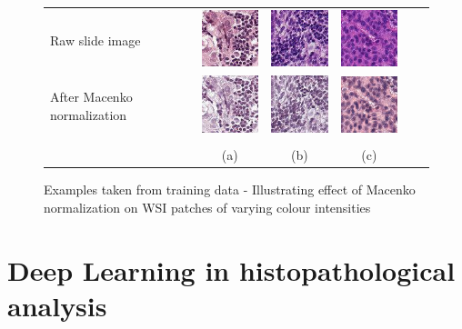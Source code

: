 \documentclass{l4proj}
\begin{document}
\begin{figure}[H]
\centering
\begin{tabular}{lccccc}
Raw slide image&
\includegraphics[width=80px]{images/37.jpeg}&
\includegraphics[width=80px]{images/68.jpeg}&
\includegraphics[width=80px]{images/195.jpeg}\\
After Macenko normalization&
 \includegraphics[width=80px]{images/37_macenko.jpeg}&
 \includegraphics[width=80px]{images/68_macenko.jpeg}&
 \includegraphics[width=80px]{images/195_macenko.jpeg}\\
 \\&
 (a)&(b)&(c)\\
\end{tabular}
\caption{Examples taken from training data - Illustrating effect of Macenko normalization on WSI patches of varying colour intensities }
\label{fig:macenko-example}
\end{figure}

\section{Deep Learning in histopathological analysis} \label{dl-application-background-section}
\end{document}
